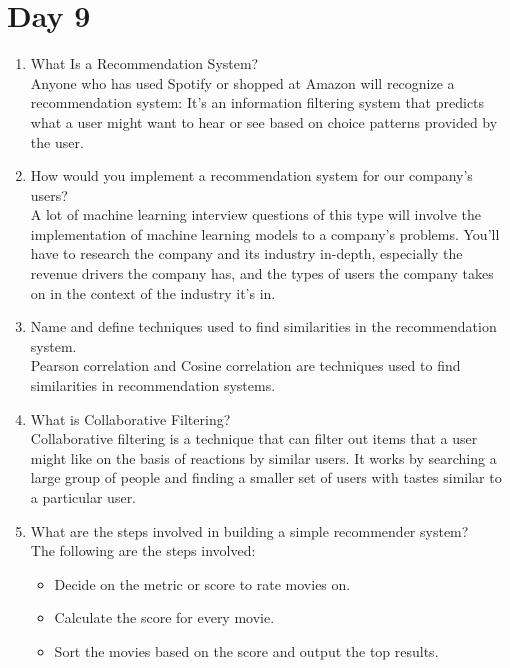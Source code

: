 \documentclass[11pt]{article}
\begin{document}
\section{Day 9}
\begin{enumerate}
\item What Is a Recommendation System?\\[.5em]
Anyone who has used Spotify or shopped at Amazon will recognize a recommendation system:
It's an information filtering system that predicts what a user might want to hear or see based on
choice patterns provided by the user.

\item How would you implement a recommendation system for our company’s
users?\\[.5em]
A lot of machine learning interview questions of this type will involve the implementation of
machine learning models to a company’s problems. You'll have to research the company and its
industry in-depth, especially the revenue drivers the company has, and the types of users the
company takes on in the context of the industry it’s in.

\item Name and define techniques used to find similarities in the recommendation system.\\[.5em]
Pearson correlation and Cosine correlation are techniques used to find similarities in
recommendation systems.

\item What is Collaborative Filtering?\\[.5em]
Collaborative filtering is a technique that can filter out items that a user might like on the basis of reactions by similar users. It works by searching a large group of people and finding a smaller set of users with tastes similar to a particular user.

\item What are the steps involved in building a simple recommender system?\\[.5em]
The following are the steps involved:
\begin{itemize}
\item	 Decide on the metric or score to rate movies on.

\item Calculate the score for every movie.

\item Sort the movies based on the score and output the top results.
\end{itemize}
\end{enumerate}
\pagebreak
\end{document}
